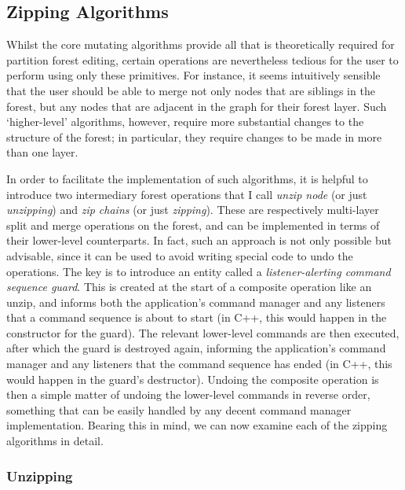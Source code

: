 \afterpage{\clearpage}
\newpage

\subsection{Zipping Algorithms}

Whilst the core mutating algorithms provide all that is theoretically required for partition forest editing, certain operations are nevertheless tedious for the user to perform using only these primitives. For instance, it seems intuitively sensible that the user should be able to merge not only nodes that are siblings in the forest, but any nodes that are adjacent in the graph for their forest layer. Such `higher-level' algorithms, however, require more substantial changes to the structure of the forest; in particular, they require changes to be made in more than one layer.

In order to facilitate the implementation of such algorithms, it is helpful to introduce two intermediary forest operations that I call \emph{unzip node} (or just \emph{unzipping}) and \emph{zip chains} (or just \emph{zipping}). These are respectively multi-layer split and merge operations on the forest, and can be implemented in terms of their lower-level counterparts. In fact, such an approach is not only possible but advisable, since it can be used to avoid writing special code to undo the operations. The key is to introduce an entity called a \emph{listener-alerting command sequence guard}. This is created at the start of a composite operation like an unzip, and informs both the application's command manager and any listeners that a command sequence is about to start (in C++, this would happen in the constructor for the guard). The relevant lower-level commands are then executed, after which the guard is destroyed again, informing the application's command manager and any listeners that the command sequence has ended (in C++, this would happen in the guard's destructor). Undoing the composite operation is then a simple matter of undoing the lower-level commands in reverse order, something that can be easily handled by any decent command manager implementation. Bearing this in mind, we can now examine each of the zipping algorithms in detail.

\newpage

\subsubsection{Unzipping}

